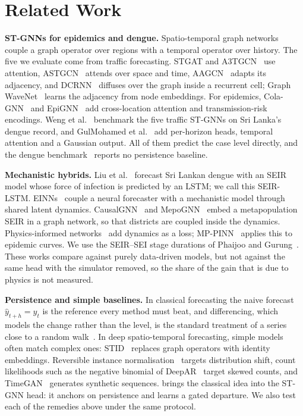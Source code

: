 \section{Related Work}
\label{sec:related}

\textbf{ST-GNNs for epidemics and dengue.} Spatio-temporal graph networks couple a
graph operator over regions with a temporal operator over history. The five we
evaluate come from traffic forecasting. STGAT and A3TGCN~\cite{bai2021a3tgcn}
use attention, ASTGCN~\cite{guo2019astgcn} attends over space and time,
AAGCN~\cite{shi2019aagcn} adapts its adjacency, and DCRNN~\cite{li2018dcrnn}
diffuses over the graph inside a recurrent cell; Graph WaveNet~\cite{wu2019graphwavenet}
learns the adjacency from node embeddings. For epidemics, Cola-GNN~\cite{deng2020colagnn}
and EpiGNN~\cite{xie2022epignn} add cross-location attention and transmission-risk
encodings. Weng et al.~\cite{weng2024graph} benchmark the five traffic ST-GNNs on Sri
Lanka's dengue record, and GulMohamed et al.~\cite{gulmohamed2026denguegnn} add
per-horizon heads, temporal attention and a Gaussian output. All of them predict the
case level directly, and the dengue benchmark~\cite{weng2024graph} reports no
persistence baseline.

\textbf{Mechanistic hybrids.} Liu et al.~\cite{liu2025seirlstm} forecast Sri Lankan
dengue with an SEIR model whose force of infection is predicted by an LSTM; we call
this SEIR-LSTM. EINNs~\cite{rodriguez2023einns} couple a neural forecaster with a
mechanistic model through shared latent dynamics. CausalGNN~\cite{wang2022causalgnn}
and MepoGNN~\cite{cao2023mepognn} embed a metapopulation SEIR in a graph network, so
that districts are coupled inside the dynamics. Physics-informed
networks~\cite{raissi2019pinn} add dynamics as a loss; MP-PINN~\cite{nguyen2024mppinn}
applies this to epidemic curves. We use the SEIR--SEI stage durations of Phaijoo and
Gurung~\cite{phaijoo2018sensitivity}. These works compare against purely data-driven
models, but not against the same head with the simulator removed, so the share of
the gain that is due to physics is not measured.

\textbf{Persistence and simple baselines.} In classical forecasting the naive forecast
$\hat y_{t+h}=y_t$ is the reference every method must beat, and differencing, which
models the change rather than the level, is the standard treatment of a series close
to a random walk~\cite{hyndman2021forecasting}. In deep
spatio-temporal forecasting, simple models often match complex ones:
STID~\cite{shao2022stid} replaces graph operators with identity embeddings.
Reversible instance normalisation~\cite{kim2022revin} targets distribution shift,
count likelihoods such as the negative binomial of DeepAR~\cite{salinas2020deepar}
target skewed counts, and TimeGAN~\cite{yoon2019timegan} generates synthetic
sequences. \model{} brings the classical idea into the ST-GNN head: it anchors on
persistence and learns a gated departure. We also test each of the remedies above
under the same protocol.
